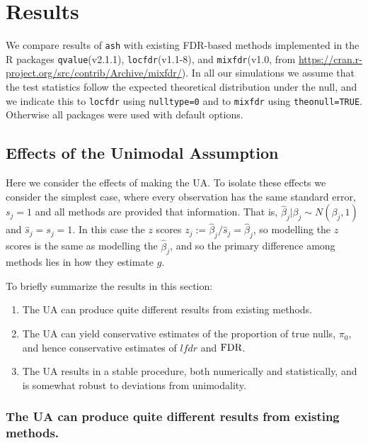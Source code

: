 \documentclass[11pt]{article}
\def\lfdr{\textit{lfdr}}
\def\bhat{\hat{\beta}}
\def\shat{\hat{s}}
\def\qvalue{{\tt qvalue}\xspace}
\def\locfdr{{\tt locfdr}\xspace}
\def\mixfdr{{\tt mixfdr}\xspace}
\def\ash{{\tt ash}\xspace}
\begin{document}
\section*{Results}

We compare results of \ash with existing FDR-based methods implemented
in the R packages \qvalue (v2.1.1), \locfdr (v1.1-8), and \mixfdr (v1.0, from \url{https://cran.r-project.org/src/contrib/Archive/mixfdr/}).
In all our simulations we assume that the test statistics follow the expected theoretical distribution under the null, and we indicate this
to \locfdr using {\tt nulltype=0} and to \mixfdr using {\tt theonull=TRUE}. Otherwise all packages were used with default options.


\subsection*{Effects of the Unimodal Assumption}

Here we consider the effects of making the UA. 
To isolate these effects we consider the simplest case, where every observation has the same
standard error, $s_j=1$ and all methods are provided that information. That is,
$\bhat_j | \beta_j \sim N(\beta_j,1)$ and $\shat_j=s_j=1$. In this case the $z$ scores $z_j:=\bhat_j/\shat_j=\bhat_j$, so modelling the $z$ scores is the same as modelling the $\bhat_j$, and so the primary difference among methods lies in how they estimate $g$.

To briefly summarize the results in this section:
\begin{enumerate}
\item The UA can produce quite different results from existing methods.
\item The UA can yield conservative estimates of the proportion of true nulls, $\pi_0$, and hence conservative estimates of $\lfdr$ and $\text{FDR}$.
\item The UA results in a stable procedure, both numerically and statistically, and is somewhat robust to deviations from unimodality.
\end{enumerate}

\subsubsection*{The UA can produce quite different results from existing methods.}
\end{document}
